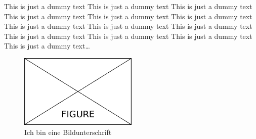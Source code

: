 \cleardoublepage

This is just a dummy text This is just a dummy text This is just a dummy text This is just a dummy text This is just a dummy text This is just a dummy text This is just a dummy text This is just a dummy text This is just a dummy text This is just a dummy text This is just a dummy text This is just a dummy text This is just a dummy text\dots

\bigskip
\begin{figure}[!h]
	\centering
	\includegraphics[width=0.5\textwidth]{Content/Figures/figure.png}
	\caption{Ich bin eine Bildunterschrift}
	\label{fig:test}
\end{figure}






